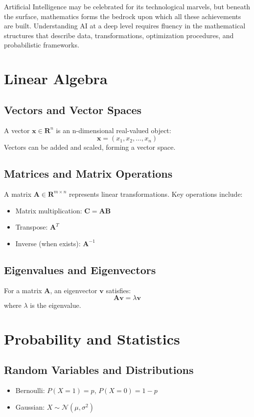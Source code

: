 \documentclass[openany]{book}
\begin{document}
Artificial Intelligence may be celebrated for its technological marvels, but 
beneath the surface, mathematics forms the bedrock upon which all these 
achievements are built. Understanding AI at a deep level requires fluency in the 
mathematical structures that describe data, transformations, optimization 
procedures, and probabilistic frameworks.

\section{Linear Algebra}

\subsection{Vectors and Vector Spaces}
A vector $\mathbf{x} \in \mathbf{R}^n$ is an n-dimensional real-valued object:
\[
\mathbf{x} = (x_1, x_2, \ldots, x_n)
\]
Vectors can be added and scaled, forming a vector space.

\subsection{Matrices and Matrix Operations}
A matrix $\mathbf{A} \in \mathbf{R}^{m \times n}$ represents linear 
transformations. Key operations include:
\begin{itemize}
    \item Matrix multiplication: $\mathbf{C} = \mathbf{AB}$
    \item Transpose: $\mathbf{A}^T$
    \item Inverse (when exists): $\mathbf{A}^{-1}$
\end{itemize}

\subsection{Eigenvalues and Eigenvectors}
For a matrix $\mathbf{A}$, an eigenvector $\mathbf{v}$ satisfies:
\[
\mathbf{Av} = \lambda\mathbf{v}
\]
where $\lambda$ is the eigenvalue.

\section{Probability and Statistics}

\subsection{Random Variables and Distributions}
\begin{itemize}
    \item Bernoulli: $P(X=1) = p$, $P(X=0) = 1-p$
    \item Gaussian: $X \sim \mathcal{N}(\mu, \sigma^2)$
\end{itemize}
\end{document}
